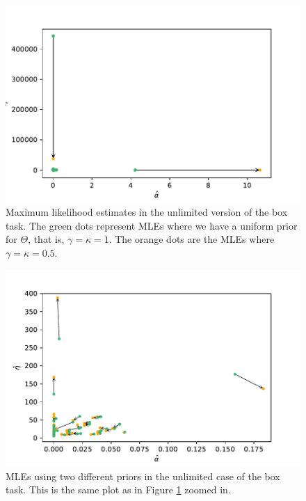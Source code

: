 \begin{figure}
    \centering
    \includegraphics[scale=0.7]{pictures/Sensitivity/mles_unlim.pdf}
    \caption[MLEs for prior with $\gamma=\kappa=1$ and $\gamma=\kappa=0.5$, unlimited]{
    Maximum likelihood estimates in the unlimited version of the box task. The green dots represent MLEs where we have a uniform prior for $\Theta$, that is, $\gamma=\kappa=1$. The orange dots are the MLEs where $\gamma=\kappa=0.5$.}
    \label{fig:sensitivity_mls_unlim}
\end{figure}
\begin{figure}
    \centering
    \includegraphics[scale=0.7]{pictures/Sensitivity/mles_unlim_zoom1.pdf}
    \caption[Zoomed in on the MLEs in Figure \ref{fig:sensitivity_mls_unlim}]{MLEs using two different priors in the unlimited case of the box task. This is the same plot as in Figure \ref{fig:sensitivity_mls_unlim} zoomed in.}
    \label{fig:sensitivity_mls_unlim_zoom1}
\end{figure}
